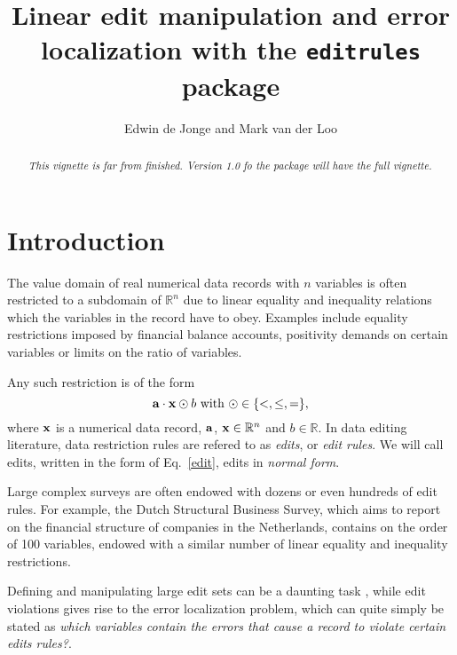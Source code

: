 \documentclass[10pt, fleqn, a4paper]{article}
\title{Linear edit manipulation and error localization with the {\tt editrules} package}
\author{Edwin de Jonge and Mark van der Loo}
\begin{document}
\maketitle
\begin{abstract}
{\em This vignette is far from finished. Version 1.0 fo the package will have
the full vignette.}
\end{abstract}

\maketitle

\tableofcontents
\newpage

\section{Introduction}
The value domain of real numerical data records with $n$ variables is often restricted
to a subdomain of $\mathbb{R}^n$ due to linear equality and inequality relations
which the variables in the record have to obey. Examples include equality restrictions imposed
by financial balance accounts, positivity demands on certain variables or limits on the
ratio of variables.

Any such restriction is of the form
\begin{equation}
\label{edit}
{\bf a}\cdot{\bf x} \odot b\textrm{ with }\odot\in\{<,\leq,=\},
\end{equation}
where $\bf x$ is a numerical data record, ${\bf a}$, ${\bf x}\in \mathbb{R}^n$
and $b\in \mathbb{R}$. In data editing literature, data restriction rules
are refered to as {\em edits}, or {\em edit rules}. We will call edits, written
in the form of Eq.\ \eqref{edit}, edits in {\em normal form}. 

Large complex surveys are often endowed with dozens or even hundreds of edit
rules.  For example, the Dutch Structural Business Survey, which aims to report
on the financial structure of companies in the Netherlands, contains on the
order of 100 variables, endowed with a similar number of linear equality and
inequality restrictions.

Defining and manipulating large edit sets can be a daunting task , while 
edit violations gives rise to the error localization problem, which can quite
simply be stated as {\em which variables contain the errors that cause a record to violate certain
edits rules?}.
\end{document}
